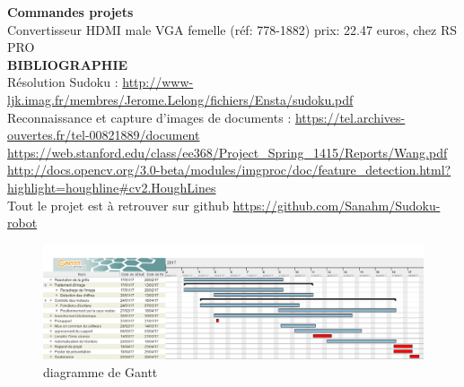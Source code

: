 \documentclass[12pt]{article}
\begin{document}
\vspace*{1cm}
\textbf{Commandes projets}\\
Convertisseur HDMI male VGA femelle (réf: 778-1882) prix: 22.47 euros, chez RS PRO\\

\vspace*{1cm}
\textbf{BIBLIOGRAPHIE}\\

\noindent
Résolution Sudoku : \url{http://www-ljk.imag.fr/membres/Jerome.Lelong/fichiers/Ensta/sudoku.pdf}\\
Reconnaissance et capture d'images de documents :  \url{https://tel.archives-ouvertes.fr/tel-00821889/document}\\
\url{https://web.stanford.edu/class/ee368/Project_Spring_1415/Reports/Wang.pdf}\\
\url{http://docs.opencv.org/3.0-beta/modules/imgproc/doc/feature_detection.html?highlight=houghline#cv2.HoughLines}\\

\noindent
Tout le projet est à retrouver sur github \url{https://github.com/Sanahm/Sudoku-robot}\\
\begin{figure}[!h]
	\centering
   	\includegraphics[scale = 0.35]{gantt.png}
   	\caption{\label{gantt} diagramme de Gantt }
\end{figure}
\end{document}
